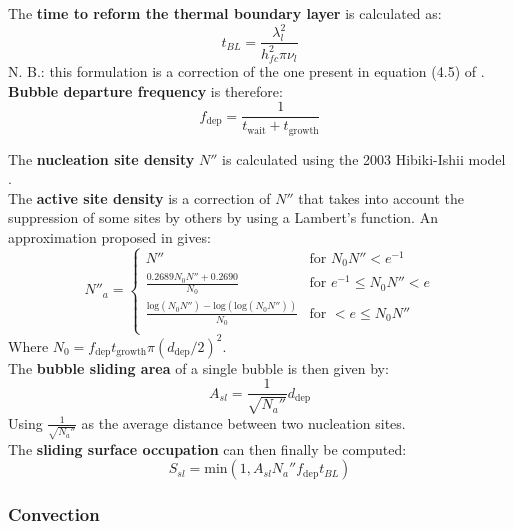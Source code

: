 The \textbf{time to reform the thermal boundary layer} is calculated as:
\begin{equation}
	t_{BL} = \frac{\lambda_l^2}{h_{fc}^2 \pi \nu_l}
\end{equation}
N. B.: this formulation is a correction of the one present in equation (4.5) of \cite{Ravik2020}.\\

\textbf{Bubble departure frequency} is therefore:
\begin{equation}
	f_\text{dep}
	=
	\frac{1}{t_\text{wait} + t_\text{growth}}
\end{equation}

The \textbf{nucleation site density} $N''$ is calculated using the 2003 Hibiki-Ishii model \cite{Hibiki2003}. \\

The \textbf{active site density} is a correction of $N''$ that takes into account the suppression of some sites by others by using a Lambert's function. An approximation proposed in \cite{Ravik2020} gives:
\begin{equation}
	N''_a = 
	\begin{cases}
		N'' & \text{for~} N_0 N'' < e^{-1} \\
		\frac{0.2689 N_0 N'' + 0.2690}{N_0} 
			& \text{for~} e^{-1} \leq N_0 N'' < e \\
		\frac{\text{log}(N_0 N'') - \text{log}(\text{log}(N_0 N''))}{N_0}
			& \text{for~} < e \leq  N_0 N'' \\
	\end{cases}
\end{equation} 
Where $N_0 = f_\text{dep} t_\text{growth} \pi (d_\text{dep}/2)^2$. \\

The \textbf{bubble sliding area} of a single bubble is then given by:
\begin{equation}
	A_{sl} = \frac{1}{\sqrt{N_a''}} d_\text{dep}
\end{equation}
Using $\frac{1}{\sqrt{N_a''}}$ as the average distance between two nucleation sites.\\

The \textbf{sliding surface occupation} can then finally be computed:
\begin{equation}
	S_{sl} = \text{min}(1, A_{sl} N_a'' f_\text{dep} t_{BL} )
\end{equation}

\subsubsection{Convection}

